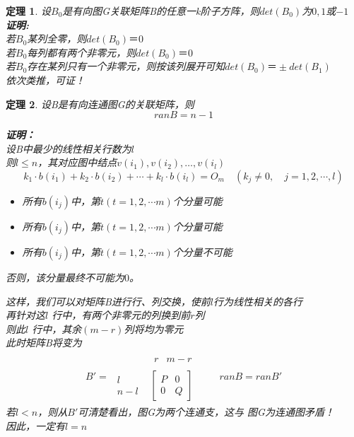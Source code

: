 \documentclass[11pt,a4paper,openany]{book}
\newcommand{\song}{\CJKfamily{song}}
\newtheorem{theorem}{\textbf{定理}}[section]
\begin{document}
\begin{theorem}
设$B_0$是有向图G关联矩阵B的任意一k阶子方阵，则$det(B_0)$为$0,1$或$-1$\\
{\song
\textbf{证明:}\\
若$B_0$某列全零，则$det(B_0)＝0$\\
若$B_0$每列都有两个非零元，则$det(B_0)＝0$\\
若$B_0$存在某列只有一个非零元，则按该列展开可知$det(B_0)＝\pm det(B_1)$\\
依次类推，可证！
}
\end{theorem}

\begin{theorem}
设B是有向连通图G的关联矩阵，则$$ran B=n-1$$
{\song
\textbf{证明：}\\
设B中最少的线性相关行数为$l$\\
则$l\leq n$，其对应图中结点$v(i_1),v(i_2),\dots,v(i_l )$\\
\begin{equation*}
k_1\cdot b(i_1) +k_2\cdot b(i_2) +\cdots +k_l\cdot b(i_l) =O_m \quad (k_j\neq 0,\quad j=1,2,\cdots,l)
\end{equation*}
\begin{itemize}
  \item
  \begin{center}
    所有$b(i_j)$中，第$t(t=1,2,\cdots m)$个分量可能
  \end{center}
  \item
  \begin{center}
    所有$b(i_j)$中，第$t(t=1,2,\cdots m)$个分量可能
  \end{center}
  \item
  \begin{center}
    所有$b(i_j)$中，第$t(t=1,2,\cdots m)$个分量不可能
  \end{center}
\end{itemize}
  \begin{flushleft}
    否则，该分量最终不可能为$0$。
\end{flushleft}
\quad 这样，我们可以对矩阵B进行行、列交换，使前$l$行为线性相关的各行\\
\quad 再针对这$l$ 行中，有两个非零元的列换到前$r$列\\
则此$l$ 行中，其余$(m-r)$列将均为零元\\
\quad 此时矩阵B将变为
\begin{align*}
 B'= \begin{array}{lc}
\mbox{}&
\begin{array}{cc}r&m-r \end{array}\\
\begin{array}{c}l\\n-l\end{array}&
\left[\begin{array}{cc}
P&0\\
0&Q
\end{array}\right]
\end{array}
\quad \quad ran B=ran B'
\end{align*}
\quad 若$l <n$，则从$B'$可清楚看出，图G为两个连通支，这与
图G为连通图矛盾！\\
因此，一定有$l=n$
}
\end{theorem}
\end{document}

